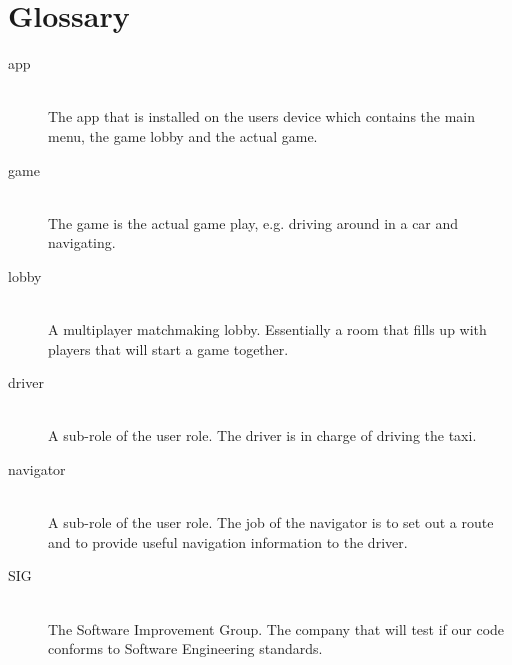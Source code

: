 \documentclass{article}
\begin{document}
\section{Glossary}
\begin{description}
\item[app] \hfill \\
The app that is installed on the users device which contains the main menu, the game lobby and the actual game.
\item[game]\hfill \\
The game is the actual game play, e.g. driving around in a car and navigating.
\item[lobby] \hfill \\
A multiplayer matchmaking lobby. Essentially a room that fills up with players that will start a game together.
\item[driver] \hfill \\
A sub-role of the user role. The driver is in charge of driving the taxi.
\item[navigator]\hfill \\
A sub-role of the user role. The job of the navigator is to set out a route and to provide useful navigation information to the driver.
\item[SIG] \hfill \\
The Software Improvement Group. The company that will test if our code conforms to Software Engineering standards.
\end{description}
\end{document}
